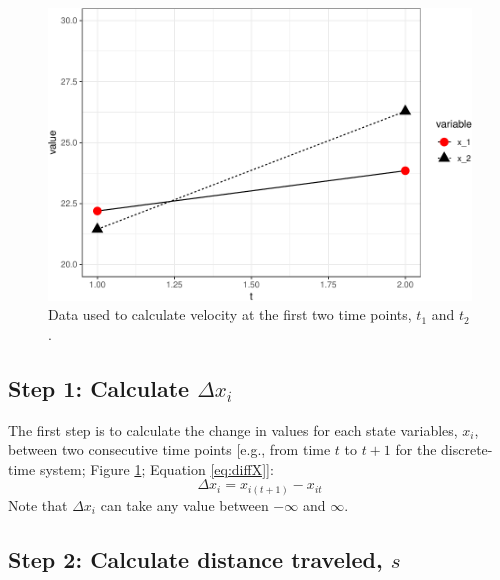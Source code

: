 \documentclass[12pt,twoside,openany]{reedthesis}
\begin{document}
\begin{figure}
\includegraphics[width=0.85\linewidth]{_myDissertation_files/figure-latex/sysEx2-1} \caption{Data used to calculate velocity at the first two time points, $t_1$ and $t_2$.}\label{fig:sysEx2}
\end{figure}
\hypertarget{step-1-calculate-delta-x_i}{%
\subsection{\texorpdfstring{Step 1: Calculate \(\Delta x_i\)}{Step 1: Calculate \textbackslash Delta x\_i}}\label{step-1-calculate-delta-x_i}}

The first step is to calculate the change in values for each state variables, \(x_i\), between two consecutive time points {[}e.g., from time \(t\) to \(t+1\) for the discrete-time system; Figure \ref{fig:sysEx2}; Equation \eqref{eq:diffX}{]}:
\begin{equation}
\Delta x_i = x_{i(t+1)} - x_{it} 
\label{eq:diffX}
\end{equation}
Note that \(\Delta x_i\) can take any value between \(-\infty\) and \(\infty\).

\hypertarget{step-2-calculate-distance-traveled-s}{%
\subsection{\texorpdfstring{Step 2: Calculate distance traveled, \(s\)}{Step 2: Calculate distance traveled, s}}\label{step-2-calculate-distance-traveled-s}}
\end{document}

